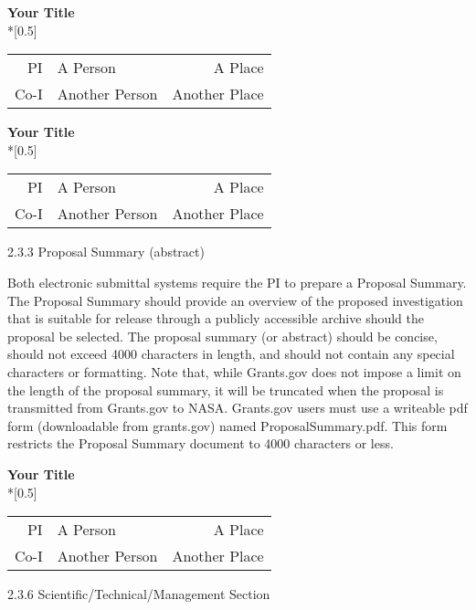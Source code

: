 \documentclass[12pt]{article}
\makeatletter
\renewcommand*{\maketitle}{
\begin{center}
  \begingroup
  \Large
  \textbf{Your Title} \\*[0.5\baselineskip]
  \normalsize
\begin{tabular}{r@{:\quad}lr}
          PI & A Person       & A Place       \\
        Co-I & Another Person & Another Place
\end{tabular}
  \endgroup
\end{center}
}
\makeatother
\begin{document}
\raggedbottom
\fontsize{12}{16}\selectfont



\maketitle

\tableofcontents



\clearpage


\maketitle

2.3.3 Proposal Summary (abstract)

Both electronic submittal systems require the PI to prepare a Proposal
Summary. The Proposal Summary should provide an overview of the
proposed investigation that is suitable for release through a publicly
accessible archive should the proposal be selected. The proposal
summary (or abstract) should be concise, should not exceed 4000
characters in length, and should not contain any special characters or
formatting. Note that, while Grants.gov does not impose a limit on the
length of the proposal summary, it will be truncated when the proposal
is transmitted from Grants.gov to NASA. Grants.gov users must use a
writeable pdf form (downloadable from grants.gov) named
ProposalSummary.pdf. This form restricts the Proposal Summary document
to 4000 characters or less.



\cleardoublepage
\setcounter{page}{1}


\maketitle

2.3.6 Scientific/Technical/Management Section
\end{document}
